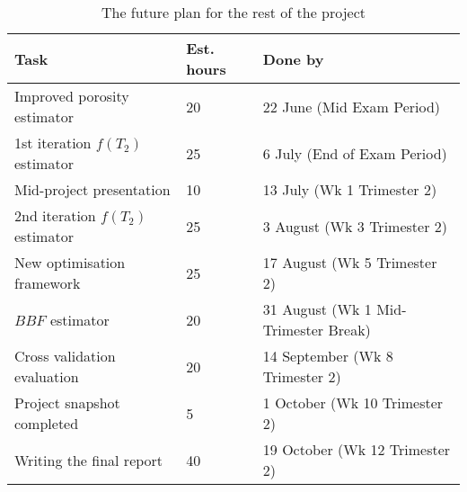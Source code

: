 \begin{table}[h]
    \centering
    \begin{tabular}{l l l}
        \toprule
        \hfill Task  &      Est. hours &     \hfill   Done by \\
        \midrule
        Improved porosity estimator \cite{venkataramanan2015newPorosity} & 20 & 22 June (Mid Exam Period) \\
        1st iteration $f(T_2)$ estimator & 25 & 6 July (End of Exam Period) \\
        Mid-project presentation & 10 & 13 July (Wk 1 Trimester 2)\\
        2nd iteration $f(T_2)$ estimator & 25 & 3 August (Wk 3 Trimester 2) \\
        New optimisation framework & 25 & 17 August (Wk 5 Trimester 2) \\
        $BBF$ estimator & 20 & 31 August (Wk 1 Mid-Trimester Break)\\
        Cross validation evaluation & 20 & 14 September (Wk 8 Trimester 2) \\
        Project snapshot completed & 5 & 1 October (Wk 10 Trimester 2)\\
        Writing the final report & 40 & 19 October (Wk 12 Trimester 2)\\
        \bottomrule
    \end{tabular}
    \caption{The future plan for the rest of the project}
    \label{tab:futurePlan}
\end{table}








